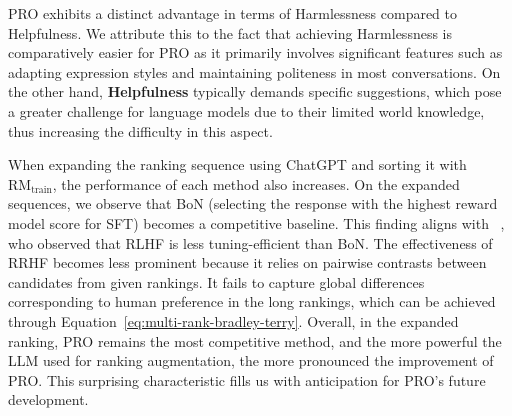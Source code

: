 PRO exhibits a distinct advantage in terms of Harmlessness compared to Helpfulness. We attribute this to the fact that achieving Harmlessness is comparatively easier for PRO as it primarily involves significant features such as adapting expression styles and maintaining politeness in most conversations. On the other hand, \textbf{Helpfulness} typically demands specific suggestions, which pose a greater challenge for language models due to their limited world knowledge, thus increasing the difficulty in this aspect.

When expanding the ranking sequence using ChatGPT and sorting it with $\text{RM}_{\text{train}}$, the performance of each method also increases. On the expanded sequences, we observe that BoN (selecting the response with the highest reward model score for SFT) becomes a competitive baseline. This finding aligns with \citeauthor{rafailov2023direct}~\citeyear{rafailov2023direct}, who observed that RLHF is less tuning-efficient than BoN. The effectiveness of RRHF becomes less prominent because it relies on pairwise contrasts between candidates from given rankings. It fails to capture global differences corresponding to human preference in the long rankings, which can be achieved through Equation~\ref{eq:multi-rank-bradley-terry}.
Overall, in the expanded ranking, PRO remains the most competitive method, and the more powerful the LLM used for ranking augmentation, the more pronounced the improvement of PRO. This surprising characteristic fills us with anticipation for PRO's future development.

